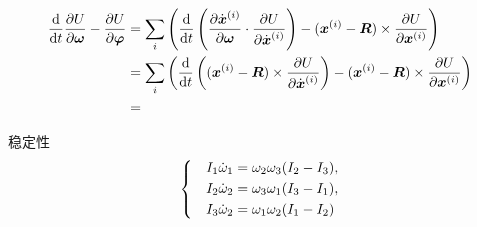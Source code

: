 \documentclass[UTF8, a4paper]{ctexart}
\newenvironment{bigcase}{\left\{\quad\begin{aligned}}{\end{aligned}\right.}
\begin{document}
\[
    \begin{aligned}
        \dv{t} \pdv{U}{\vb*{\omega}} - \pdv{U}{\vb*{\varphi}} &= \sum_i \left(\dv{t} \left(\pdv{\dot{\vb*{x}}^{(i)}}{\vb*{\omega}} \cdot \pdv{U}{\dot{\vb*{x}}^{(i)}}\right) - (\vb*{x}^{(i)} - \vb*{R}) \times \pdv{U}{\vb*{x}^{(i)}}\right) \\
        &= \sum_i \left(\dv{t} \left((\vb*{x}^{(i)} - \vb*{R}) \times \pdv{U}{\dot{\vb*{x}}^{(i)}}\right) - (\vb*{x}^{(i)} - \vb*{R}) \times \pdv{U}{\vb*{x}^{(i)}}\right) \\
        &= 
    \end{aligned}
\]

稳定性
\begin{equation}
    \begin{bigcase}
        I_1 \dot{\omega}_1 &= \omega_2 \omega_3 (I_2 - I_3), \\
        I_2 \dot{\omega}_2 &= \omega_3 \omega_1 (I_3 - I_1), \\
        I_3 \dot{\omega}_2 &= \omega_1 \omega_2 (I_1 - I_2)
    \end{bigcase}
\end{equation}
\end{document}
